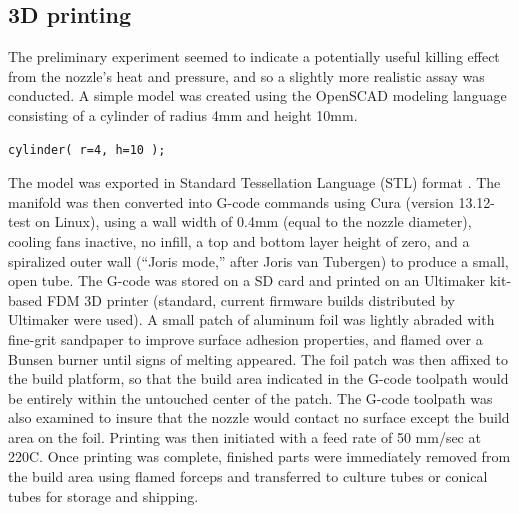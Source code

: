 \begin{refsection}
\subsection{3D printing}\label{3Dprinting}

The preliminary experiment seemed to indicate a potentially useful
killing effect from the nozzle’s heat and pressure, and so a slightly
more realistic assay was conducted. A simple model was created using
the OpenSCAD \cite{OpenSCAD} modeling language consisting of a
cylinder of radius 4mm and height 10mm.

\begin{verbatim}
cylinder( r=4, h=10 );
\end{verbatim}

The model was exported in Standard Tessellation Language (STL) format
\cite{burns1993}. The manifold was then converted into G-code commands
\cite{gcode} using Cura (version 13.12-test on Linux), using a wall
width of 0.4mm (equal to the nozzle diameter), cooling fans inactive,
no infill, a top and bottom layer height of zero, and a spiralized
outer wall (``Joris mode,'' after Joris van Tubergen) to produce a
small, open tube.  The G-code was stored on a SD card and printed on
an Ultimaker kit-based FDM 3D printer (standard, current firmware
builds distributed by Ultimaker were used). A small patch of aluminum
foil was lightly abraded with fine-grit sandpaper to improve surface
adhesion properties, and flamed over a Bunsen burner until signs of
melting appeared. The foil patch was then affixed to the build
platform, so that the build area indicated in the G-code toolpath
would be entirely within the untouched center of the patch. The G-code
toolpath was also examined to insure that the nozzle would contact no
surface except the build area on the foil. Printing was then initiated
with a feed rate of 50 mm/sec at 220C. Once printing was complete,
finished parts were immediately removed from the build area using
flamed forceps and transferred to culture tubes or conical tubes for
storage and shipping.

\begin{figure}
    \centering



\end{figure}
\end{refsection}
